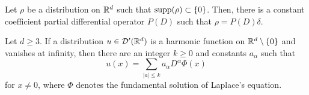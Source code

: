 \documentclass[12pt]{article}
\begin{document}
\begin{lem*}
Let $\rho$ be a distribution on $\mathbb{R}^d$ such that $\operatorname{supp}(\rho)\subset\{0\}$.
Then, there is a constant coefficient partial differential operator $P(D)$ such that $\rho=P(D)\delta$.
\end{lem*}

\begin{cor*}
Let $d\ge3$.
If a distribution $u\in\mathcal{D}'(\mathbb{R}^d)$ is a harmonic function on $\mathbb{R}^d\setminus\{0\}$ and vanishes at infinity, then there are an integer $k\ge0$ and constants $a_\alpha$ such that
\[u(x)=\sum_{|a|\le k}a_\alpha D^\alpha\Phi(x)\]
for $x\ne0$, where $\Phi$ denotes the fundamental solution of Laplace's equation.
\end{cor*}
\end{document}
